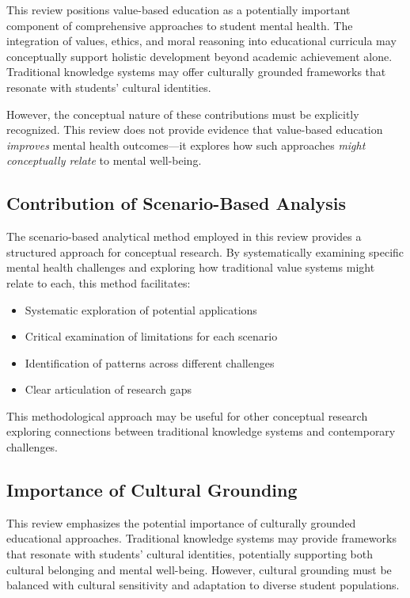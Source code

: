 \documentclass[12pt,a4paper,twocolumn]{article}
\begin{document}
This review positions value-based education as a potentially important component of comprehensive approaches to student mental health. The integration of values, ethics, and moral reasoning into educational curricula may conceptually support holistic development beyond academic achievement alone. Traditional knowledge systems may offer culturally grounded frameworks that resonate with students' cultural identities.

However, the conceptual nature of these contributions must be explicitly recognized. This review does not provide evidence that value-based education \textit{improves} mental health outcomes—it explores how such approaches \textit{might conceptually relate} to mental well-being.

\subsection{Contribution of Scenario-Based Analysis}

The scenario-based analytical method employed in this review provides a structured approach for conceptual research. By systematically examining specific mental health challenges and exploring how traditional value systems might relate to each, this method facilitates:
\begin{itemize}
    \item Systematic exploration of potential applications
    \item Critical examination of limitations for each scenario
    \item Identification of patterns across different challenges
    \item Clear articulation of research gaps
\end{itemize}

This methodological approach may be useful for other conceptual research exploring connections between traditional knowledge systems and contemporary challenges.

\subsection{Importance of Cultural Grounding}

This review emphasizes the potential importance of culturally grounded educational approaches. Traditional knowledge systems may provide frameworks that resonate with students' cultural identities, potentially supporting both cultural belonging and mental well-being. However, cultural grounding must be balanced with cultural sensitivity and adaptation to diverse student populations.
\end{document}
